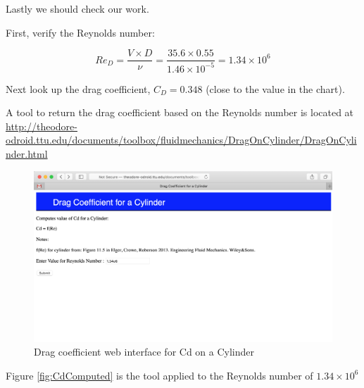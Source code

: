\documentclass[12pt]{article}
\begin{document}
Lastly we should check our work.

First, verify the Reynolds number:

\begin{equation}
Re_D = \frac{V \times D}{\nu} =  \frac{35.6 \times 0.55}{1.46 \times 10^{-5}} = 1.34 \times 10^{6}
\end{equation}

Next look up the drag coefficient, $C_D = 0.348$ (close to the value in the chart).

A tool to return the drag coefficient based on the Reynolds number is located at\\
\url{http://theodore-odroid.ttu.edu/documents/toolbox/fluidmechanics/DragOnCylinder/DragOnCylinder.html}\\
\begin{figure}[h!] %
   \centering
   \includegraphics[width=6in]{CdInterface.pdf} 
   \caption{Drag coefficient web interface for Cd on a Cylinder}
   \label{fig:CdInterface}
\end{figure}
\newline
Figure \ref{fig:CdComputed} is the tool applied to the Reynolds number of $1.34 \times 10^{6}$
\end{document}
